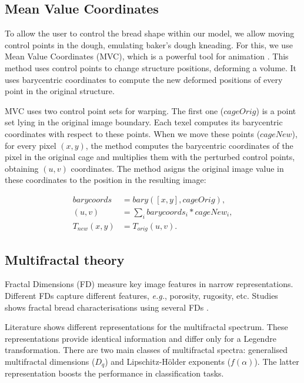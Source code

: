 \documentclass[final,5p,times]{elsarticle}
\begin{document}
{%
\subsection{Mean Value Coordinates}
To allow the user to control the bread shape within our model, we allow moving control points in the dough, emulating baker's dough kneading. For this, we use Mean Value Coordinates (MVC), which is a powerful tool for animation \cite{Floater2003,Floater2005,Ju2005}.  This method uses control points to change structure positions, deforming a volume. It uses barycentric coordinates to compute the new deformed positions of every point in the original structure.

MVC uses two control point sets for warping. The first one ($cageOrig$) is a point set lying in the original image boundary.  Each texel computes its barycentric coordinates with respect to these points. When we move these points ($cageNew$), for every pixel $(x,y)$, the method computes the barycentric coordinates of the pixel in the original cage and multiplies them with the perturbed control points, obtaining $(u,v)$ coordinates. The method asigns the original image value in these coordinates to the position in the resulting image:

\begin{align}
barycoords &= bary([x,y],cageOrig),\\
(u,v) &= \sum_{i} {barycoords_{i} * cageNew_{i}}, \\
T_{new}(x,y) &= T_{orig}(u,v).
\end{align}

\subsection{Multifractal theory}

Fractal Dimensions (FD) measure key image features in narrow representations. Different FDs capture different features, {\em e.g.}, porosity, rugosity, etc. Studies shows fractal bread characterisations using several FDs \cite{Gonzales2008,Baravalle2012}. 

Literature shows different representations for the multifractal spectrum. These representations provide identical information and differ only for a Legendre transformation. There are two main classes of multifractal spectra: generalised multifractal dimensions ($D_{q}$) and Lipschitz-H\"older exponents ($f(\alpha)$). The latter representation boosts the performance in classification tasks.

}
\end{document}
